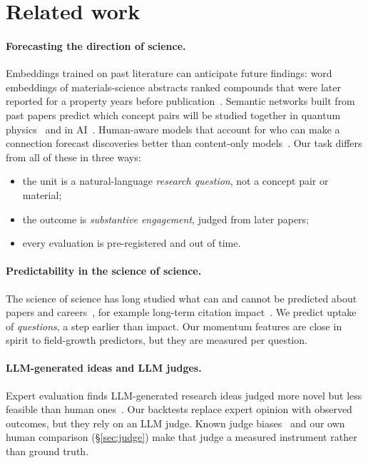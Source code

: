 \documentclass[11pt]{article}
\begin{document}
\section{Related work}

\paragraph{Forecasting the direction of science.} Embeddings trained on past
literature can anticipate future findings: word embeddings of materials-science
abstracts ranked compounds that were later reported for a property years before
publication~\cite{tshitoyan2019}. Semantic networks built from past papers
predict which concept pairs will be studied together in quantum
physics~\cite{krenn2020} and in AI~\cite{krenn2023}. Human-aware models that
account for who can make a connection forecast discoveries better than
content-only models~\cite{sourati2023}. Our task differs from all of these in
three ways:
\begin{itemize}
\item the unit is a natural-language \emph{research question}, not a concept
  pair or material;
\item the outcome is \emph{substantive engagement}, judged from later papers;
\item every evaluation is pre-registered and out of time.
\end{itemize}

\paragraph{Predictability in the science of science.} The science of science
has long studied what can and cannot be predicted about papers and
careers~\cite{clauset2017}, for example long-term citation
impact~\cite{wang2013}. We predict uptake of \emph{questions}, a step earlier
than impact. Our momentum features are close in spirit to field-growth
predictors, but they are measured per question.

\paragraph{LLM-generated ideas and LLM judges.} Expert evaluation finds
LLM-generated research ideas judged more novel but less feasible than human
ones~\cite{si2024}. Our backtests replace expert opinion with observed outcomes,
but they rely on an LLM judge. Known judge biases~\cite{zheng2023} and our own
human comparison (\S\ref{sec:judge}) make that judge a measured instrument
rather than ground truth.
\end{document}
